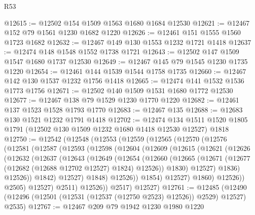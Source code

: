 \begin{lexlean}{R53}
\begin{coremodule}
@12615 := @12502 @154 @1509 @1563 @1680 @1684 @12530
@12621 := @12467 @152 @79 @1561 @1230 @1682 @1220
@12626 := @12461 @151 @1555 @1560 @1723 @1682
@12632 := @12467 @149 @130 @1553 @1232 @1721 @1418
@12637 := @12474 @148 @1548 @1552 @1738 @1721
@12643 := @12502 @147 @1509 @1547 @1680 @1737 @12530
@12649 := @12467 @145 @79 @1545 @1230 @1735 @1220
@12654 := @12461 @144 @1539 @1544 @1758 @1735
@12660 := @12467 @142 @130 @1537 @1232 @1756 @1418
@12665 := @12474 @141 @1532 @1536 @1773 @1756
@12671 := @12502 @140 @1509 @1531 @1680 @1772 @12530
@12677 := @12467 @138 @79 @1529 @1230 @1770 @1220
@12682 := @12461 @137 @1523 @1528 @1793 @1770
@12683 := @12467 @135
@12688 := @12683 @130 @1521 @1232 @1791 @1418
@12702 := @12474
    @134
    @1511
    @1520
    @1805
    @1791
    (@12502 @130 @1509 @1232 @1680 @1418 @12530 @12527)
    @1818
@12750 := @12542
    (@12548
      (@12553
        (@12559
          (@12565
            (@12570
              (@12576
                (@12581
                  (@12587
                    (@12593
                      (@12598
                        (@12604
                          (@12609
                            (@12615
                              (@12621
                                (@12626
                                  (@12632
                                    (@12637
                                      (@12643
                                        (@12649
                                          (@12654
                                            (@12660
                                              (@12665
                                                (@12671
                                                  (@12677
                                                    (@12682 (@12688 @12702 @12527) @1824)
                                                    @12526))
                                                @1830)
                                              @12527)
                                            @1836)
                                          @12526))
                                      @1842)
                                    @12527)
                                  @1848)
                                @12526))
                            @1854)
                          @12527)
                        @1860)
                      @12526))
                  @2505)
                @12527)
              @2511)
            @12526))
        @2517)
      @12527)
@12761 := @12485
    (@12490 (@12496 (@12501 (@12531 (@12537 (@12750 @2523) @12526)) @2529) @12527) @2535)
@12767 := @12467 @209 @79 @1942 @1230 @1980 @1220

\end{coremodule}
\end{lexlean}

